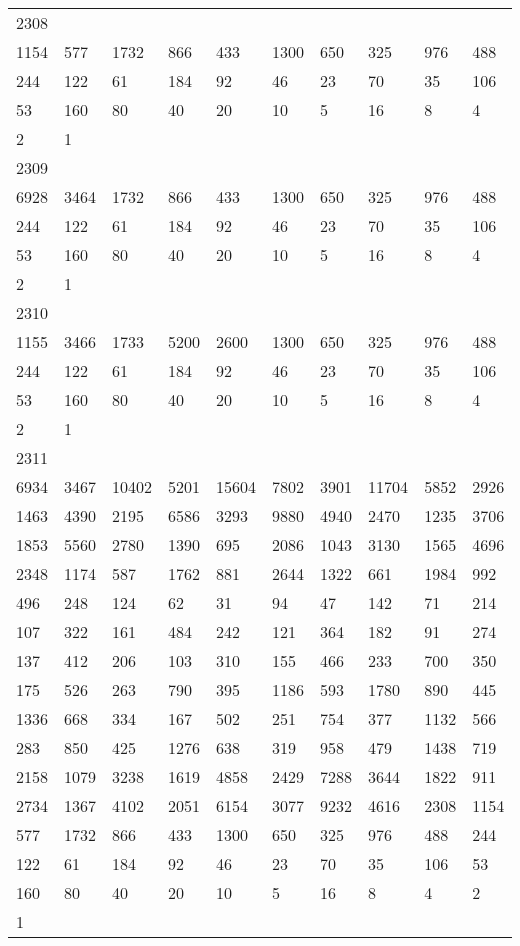 \begin{longtable}{*{10}{l}}
2308&&&&&&&&&\\
1154& 577& 1732& 866& 433& 1300& 650& 325& 976& 488\\
244& 122& 61& 184& 92& 46& 23& 70& 35& 106\\
53& 160& 80& 40& 20& 10& 5& 16& 8& 4\\
2& 1& \\

2309&&&&&&&&&\\
6928& 3464& 1732& 866& 433& 1300& 650& 325& 976& 488\\
244& 122& 61& 184& 92& 46& 23& 70& 35& 106\\
53& 160& 80& 40& 20& 10& 5& 16& 8& 4\\
2& 1& \\

2310&&&&&&&&&\\
1155& 3466& 1733& 5200& 2600& 1300& 650& 325& 976& 488\\
244& 122& 61& 184& 92& 46& 23& 70& 35& 106\\
53& 160& 80& 40& 20& 10& 5& 16& 8& 4\\
2& 1& \\

2311&&&&&&&&&\\
6934& 3467& 10402& 5201& 15604& 7802& 3901& 11704& 5852& 2926\\
1463& 4390& 2195& 6586& 3293& 9880& 4940& 2470& 1235& 3706\\
1853& 5560& 2780& 1390& 695& 2086& 1043& 3130& 1565& 4696\\
2348& 1174& 587& 1762& 881& 2644& 1322& 661& 1984& 992\\
496& 248& 124& 62& 31& 94& 47& 142& 71& 214\\
107& 322& 161& 484& 242& 121& 364& 182& 91& 274\\
137& 412& 206& 103& 310& 155& 466& 233& 700& 350\\
175& 526& 263& 790& 395& 1186& 593& 1780& 890& 445\\
1336& 668& 334& 167& 502& 251& 754& 377& 1132& 566\\
283& 850& 425& 1276& 638& 319& 958& 479& 1438& 719\\
2158& 1079& 3238& 1619& 4858& 2429& 7288& 3644& 1822& 911\\
2734& 1367& 4102& 2051& 6154& 3077& 9232& 4616& 2308& 1154\\
577& 1732& 866& 433& 1300& 650& 325& 976& 488& 244\\
122& 61& 184& 92& 46& 23& 70& 35& 106& 53\\
160& 80& 40& 20& 10& 5& 16& 8& 4& 2\\
1& \\


\end{longtable}
